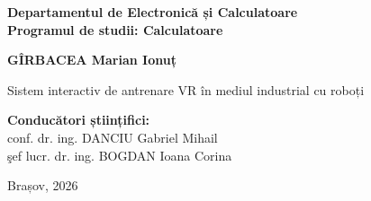 \begin{titlepage}
\begin{flushleft}
\textbf{Departamentul de Electronică și Calculatoare}\\
\textbf{Programul de studii: Calculatoare}
\end{flushleft}

 
	\begin{center}		
		\vspace{1.5cm}
		\Large \textbf{GÎRBACEA Marian Ionuț}
		
		\vspace{1cm} 
		
		\Huge Sistem interactiv de antrenare VR în mediul industrial cu roboți
		\\
		
		\vfill

        \Large
        \textbf{Conducători științifici:} \\
        conf. dr. ing.  DANCIU Gabriel Mihail\\
		şef lucr. dr. ing. BOGDAN Ioana Corina

		\vfill
		
		\Large
		Brașov, 2026
		
	\end{center}
\end{titlepage}